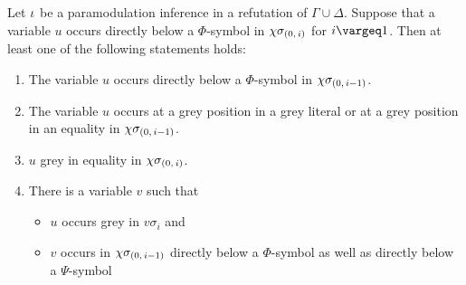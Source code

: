 \documentclass[,%
	draft=false,%
	numbers=noendperiod
	12pt,
	a4paper,
	oneside,%
	openany,
]{memoir}
\newcommand{\inv}{\ensuremath{\chi}}
\begin{document}
\begin{lemma}
	\label{lemma:var_below_phi_symbol_paramod}
	Let $\iota$ be a paramodulation inference in a refutation of $\Gamma\cup\Delta$.
	Suppose that a variable $u$ occurs directly below a $\Phi$-symbol in $\inv\sigmazi$ for $i\vargeq 1$.
	Then at least one of the following statements holds:
	\begin{enumerate}
		\item
			\label{15_1}
			The variable $u$ occurs directly below a $\Phi$-symbol in $\inv\sigmazmi$.

		\item
			\label{15_4}
			The variable $u$ occurs at a grey position in a grey literal or at a grey position in an equality in $\inv\sigmazmi$.

		\item
			\label{15_3}
			$u$ grey in equality in $\inv\sigmazi$. 

		\item 
			\label{15_2}
			There is a variable $v$ such that 
			{
				\renewcommand{\labelitemi}{\textendash}
				\begin{itemize}
					\item $u$ occurs grey in $v\sigma_i$ and
					\item $v$ occurs in $\inv\sigmazmi$ directly below a $\Phi$-symbol as well as directly below a $\Psi$-symbol
				\end{itemize}
			}


	\end{enumerate}
\end{lemma}
\cbstart
\end{document}
